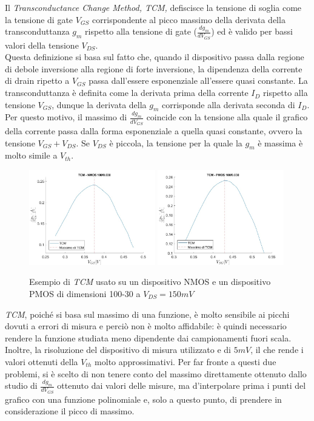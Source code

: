 \documentclass[12pt, letterpaper]{book}
\begin{document}
Il
\emph{Transconductance Change Method, TCM,} defiscisce la tensione di soglia come la tensione di gate $V_{GS}$ corrispondente al picco massimo 
della derivata della transconduttanza $g_m$ rispetto alla tensione di gate 
($\frac{dg_m}{dV_ {GS}}$) ed è valido per bassi valori della tensione $V_{DS}$.\\
Questa definizione si basa sul fatto che, quando il dispositivo passa dalla regione di debole inversione alla regione di forte inversione, la dipendenza della corrente di drain ripetto a $V_{GS}$ passa dall'essere esponenziale all'essere quasi constante.
La transconduttanza è definita come la derivata prima della corrente $I_D$ rispetto alla tensione $V_{GS}$, dunque la derivata della $g_m$ corrisponde alla derivata seconda di $I_D$. Per questo motivo, il massimo di $\frac{dg_m}{dV_{GS}}$ coincide con la tensione alla quale il grafico della corrente passa dalla forma esponenziale a quella quasi constante, ovvero la tensione $V_{GS}+V_{DS}$. Se $V_{DS}$ è piccola, la tensione per la quale la $g_m$ è massima è molto simile a $V_{th}$.\\

\begin{figure}[h!]
  \centering
  \includegraphics[width=0.49\textwidth]{TCM-N4-100-30-NoFit}
  \includegraphics[width=0.49\textwidth]{TCM-P1-100-30-NoFit}
  \caption{Esempio di \emph{TCM} usato su un dispositivo NMOS e un dispositivo PMOS di dimensioni 100-30 a $V_{DS} = 150 mV$}
\end{figure}

\emph{TCM}, 
poiché si basa sul massimo di una funzione, è molto sensibile ai picchi dovuti a errori di misura e perciò non è molto affidabile:
è quindi necessario rendere la funzione studiata meno dipendente dai campionamenti fuori scala. Inoltre, la risoluzione del dispositivo di misura utilizzato e di $5 mV$, il che rende i valori ottenuti della $V_{th}$ molto approssimativi.
Per far fronte a questi due problemi, si è scelto di non tenere conto del massimo direttamente ottenuto dallo studio di $\frac{dg_m}{dV_{GS}}$ ottenuto dai valori delle misure, ma d'interpolare prima i punti del grafico con una funzione polinomiale e, solo a questo punto, di prendere in considerazione il picco di massimo. \\
\end{document}
